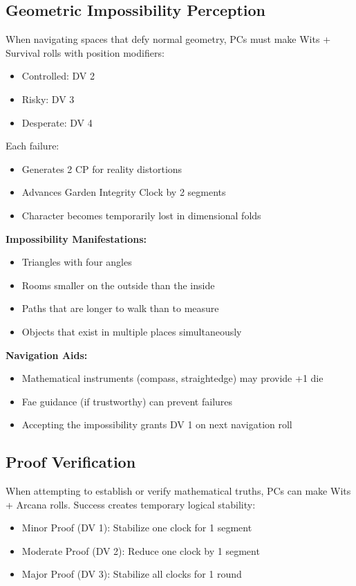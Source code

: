 \documentclass[11pt]{article}
\begin{document}
\subsection{Geometric Impossibility Perception}

When navigating spaces that defy normal geometry, PCs must make Wits + Survival rolls with position modifiers:
\begin{itemize}
\item Controlled: DV 2
\item Risky: DV 3
\item Desperate: DV 4
\end{itemize}

Each failure:
\begin{itemize}
\item Generates 2 CP for reality distortions
\item Advances Garden Integrity Clock by 2 segments
\item Character becomes temporarily lost in dimensional folds
\end{itemize}

\textbf{Impossibility Manifestations:}
\begin{itemize}
\item Triangles with four angles
\item Rooms smaller on the outside than the inside
\item Paths that are longer to walk than to measure
\item Objects that exist in multiple places simultaneously
\end{itemize}

\textbf{Navigation Aids:}
\begin{itemize}
\item Mathematical instruments (compass, straightedge) may provide +1 die
\item Fae guidance (if trustworthy) can prevent failures
\item Accepting the impossibility grants DV 1 on next navigation roll
\end{itemize}

\subsection{Proof Verification}

When attempting to establish or verify mathematical truths, PCs can make Wits + Arcana rolls. Success creates temporary logical stability:
\begin{itemize}
\item Minor Proof (DV 1): Stabilize one clock for 1 segment
\item Moderate Proof (DV 2): Reduce one clock by 1 segment
\item Major Proof (DV 3): Stabilize all clocks for 1 round
\end{itemize}
\end{document}
